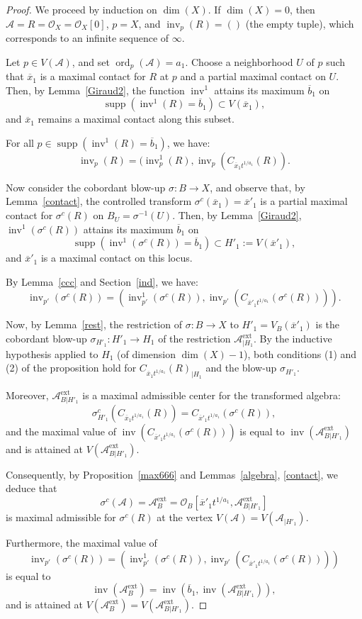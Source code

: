 \documentclass{amsart}
\newcommand{\ext}{{\operatorname{ext}}}
\newcommand{\ord}{{\operatorname{ord}}}
\newcommand{\inv}{{\operatorname{inv}}}
\def\supp{{\operatorname{supp}}}
\begin{document}
\begin{proof}
We proceed by induction on $\dim(X)$. If $\dim(X) = 0$, then $\mathcal{A} = R = \mathcal{O}_X = \mathcal{O}_X[0]$, $p = X$, and $\inv_p(R) = ()$ (the empty tuple), which corresponds to an infinite sequence of $\infty$.

Let $p \in V(\mathcal{A})$, and set $\ord_p(\mathcal{A}) = a_1$. Choose a neighborhood $U$ of $p$ such that $\overline{x}_1$ is a maximal contact for $R$ at $p$ and a partial maximal contact on $U$. Then, by Lemma~\ref{Giraud2}, the function $\inv^1$ attains its maximum $\overline{b}_1$ on
\[
\supp( \inv^1(R)= \overline{b}_1) \subset V(\overline{x}_1),
\]
and $\overline{x}_1$ remains a maximal contact along this subset.

For all $p \in \supp (\inv^1(R)=\overline{b}_1)$, we have:
\[
\inv_p(R) = (\inv^1_p(R), \inv_p(C_{\overline{x}_1 t^{1/a_1}}(R)).
\]

Now consider the cobordant blow-up $\sigma: B \to X$, and observe that, by Lemma~\ref{contact}, the controlled transform $\sigma^c(\overline{x}_1) = \overline{x}'_1$ is a partial maximal contact for $\sigma^c(R)$ on $B_U = \sigma^{-1}(U)$. Then, by Lemma~\ref{Giraud2}, $\inv^1(\sigma^c(R))$ attains its maximum $\overline{b}_1$ on
\[
\supp (\inv^1(\sigma^c(R))= \overline{b}_1) \subset H'_1 := V(\overline{x}'_1),
\]
and $\overline{x}'_1$ is a maximal contact on this locus.

By Lemma~\ref{ccc} and Section~\ref{ind}, we have:
\[
\inv_{p'}(\sigma^c(R)) = \left( \inv^1_{p'}(\sigma^c(R)), \inv_{p'}(C_{\overline{x}'_1 t^{1/a_1}}(\sigma^c(R))) \right).
\]

Now, by Lemma~\ref{rest}, the restriction of $\sigma: B \to X$ to $H'_1 = V_B(\overline{x}'_1)$ is the cobordant blow-up $\sigma_{H'_1}: H'_1 \to H_1$ of the restriction $\mathcal{A}^{\ext}_{|H_1}$. By the inductive hypothesis applied to $H_1$ (of dimension $\dim(X) - 1$), both conditions (1) and (2) of the proposition hold for $C_{\overline{x}_1 t^{1/a_1}}(R)_{|H_1}$ and the blow-up $\sigma_{H'_1}$. 

Moreover, $\mathcal{A}^{\ext}_{B|H'_1}$ is a maximal admissible center for the transformed algebra:
\[
\sigma^c_{H'_1}(C_{\overline{x}_1 t^{1/a_1}}(R))
= C_{\overline{x}'_1 t^{1/a_1}}(\sigma^c(R)),
\]
and the maximal value of $\inv(C_{\overline{x}'_1 t^{1/a_1}}(\sigma^c(R)))$ is equal to $\inv(\mathcal{A}^{\ext}_{B|H'_1})$ and is attained at $V(\mathcal{A}^{\ext}_{B|H'_1})$.

Consequently, by Proposition~\ref{max666} and Lemmas~\ref{algebra}, \ref{contact}, we deduce that
\[
\sigma^c(\mathcal{A})
= \mathcal{A}_B^{\ext}
= \mathcal{O}_B[\overline{x}'_1 t^{1/a_1}, \mathcal{A}^{\ext}_{B|H'_1}]
\]
is maximal admissible for $\sigma^c(R)$ at the vertex $V(\mathcal{A}) = V(\mathcal{A}_{|H'_1})$.

Furthermore, the maximal value of
\[
\inv_{p'}(\sigma^c(R))
= \left( \inv^1_{p'}(\sigma^c(R)), \inv_{p'}(C_{\overline{x}'_1 t^{1/a_1}}(\sigma^c(R))) \right)
\]
is equal to
\[
\inv(\mathcal{A}^{\ext}_B)
= \inv(\overline{b}_1, \inv(\mathcal{A}^{\ext}_{B|H'_1})),
\]
and is attained at $V(\mathcal{A}^{\ext}_B) = V(\mathcal{A}^{\ext}_{B|H'_1})$.
\end{proof}
\end{document}
